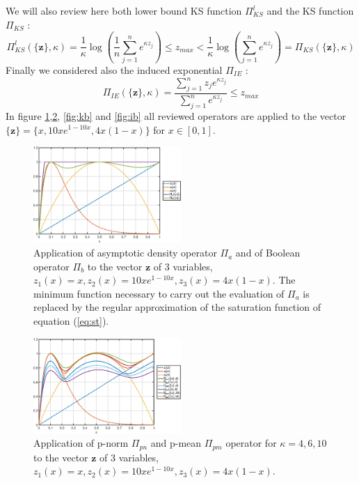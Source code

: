 We will also review here both lower bound KS function $\Pi^l_{KS}$ and the KS function $\Pi_{KS}$ \cite{kreisselmeier1980systematic}:
\begin{equation}
    \Pi^l_{KS}(\lbrace \mathbf{z}\rbrace,\kappa)=\frac{1}{\kappa}\log{\left(\frac{1}{n}\sum_{j=1}^n e^{\kappa z_j}\right)}\leq z_{max} <\frac{1}{\kappa}\log{\left(\sum_{j=1}^n e^{\kappa z_j}\right)}=\Pi_{KS}(\lbrace \mathbf{z}\rbrace,\kappa)
\end{equation}
Finally we considered also the induced exponential $\Pi_{IE}$ \cite{kennedy2015improved}:
\begin{equation}
     \Pi_{IE}(\lbrace \mathbf{z}\rbrace,\kappa)=\frac{\sum_{j=1}^n z_j e^{\kappa z_j}}{\sum_{j=1}^n e^{\kappa z_j}}\leq z_{max}
\end{equation}
In figure \ref{fig:pbb},\ref{fig:pb}, \ref{fig:kb} and \ref{fig:ib} all reviewed operators are applied to the vector $\lbrace\mathbf{z}\rbrace=\{x,10xe^{1-10x},4x(1-x)\}$ for $x\in[0,1]$.
\begin{figure}[!ht]
\centering
  \includegraphics[width=0.5\textwidth]{images/Ch3/pbbench.eps}
\caption{Application of asymptotic density operator $\Pi_{a}$ and of  Boolean operator $\Pi_{b}$ to the vector $\mathbf{z}$ of 3 variables,$z_1(x)=x,z_2(x)=10xe^{1-10x},z_3(x)=4x(1-x)$. The minimum function necessary to carry out the evaluation of $\Pi_{a}$ is replaced by the regular approximation of the saturation function of equation (\ref{eq:st}). }
\label{fig:pbb}       %
\end{figure}
\begin{figure}[!ht]
\centering
  \includegraphics[width=0.5\textwidth]{images/Ch3/pmpnbench.eps}
\caption{Application of p-norm $\Pi_{pn}$ and p-mean $\Pi_{pm}$ operator for $\kappa=4,6,10$ to the vector $\mathbf{z}$ of 3 variables,$z_1(x)=x,z_2(x)=10xe^{1-10x},z_3(x)=4x(1-x)$.}
\label{fig:pb}       %
\end{figure}
